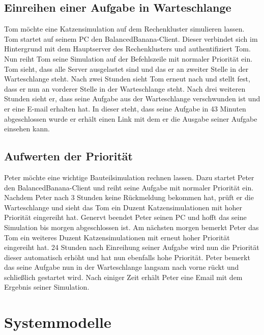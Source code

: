 \documentclass[a4paper,12pt]{article}
\begin{document}
\subsection{\textbf{Einreihen einer Aufgabe in Warteschlange}}
Tom möchte eine Katzensimulation auf dem Rechenkluster simulieren lassen. %
Tom startet auf seinem PC den BalancedBanana-Client. Dieser verbindet sich im Hintergrund mit dem Hauptserver des Rechenklusters und authentifiziert Tom.
Nun reiht Tom seine Simulation auf der Befehlszeile mit normaler Priorität ein.
Tom sieht, dass alle Server ausgelastet sind und das er an zweiter Stelle in der Warteschlange steht.
Nach zwei Stunden sieht Tom erneut nach und stellt fest, dass er nun an vorderer Stelle in der Warteschlange steht.
Nach drei weiteren Stunden sieht er, dass seine Aufgabe aus der Warteschlange verschwunden ist und er eine E-mail erhalten hat.
In dieser steht, dass seine Aufgabe in 43 Minuten abgeschlossen wurde er erhält einen Link mit dem er die Ausgabe seiner Aufgabe einsehen kann.

\subsection{\textbf{Aufwerten der Priorität}}
Peter möchte eine wichtige Bauteilsimulation rechnen lassen.
Dazu startet Peter den BalancedBanana-Client und reiht seine Aufgabe mit normaler Priorität ein.
Nachdem Peter nach 3 Stunden keine Rückmeldung bekommen hat, prüft er die Warteschlange und sieht das Tom ein Duzent Katzensimulationen mit hoher Priorität eingereiht hat.
Genervt beendet Peter seinen PC und hofft das seine Simulation bis morgen abgeschlossen ist.
Am nächsten morgen bemerkt Peter das Tom ein weiteres Duzent Katzensimulationen mit erneut hoher Priorität eingereiht hat.
24 Stunden nach Einreihung seiner Aufgabe wird nun die Priorität dieser automatisch erhöht und hat nun ebenfalls hohe Priorität.
Peter bemerkt das seine Aufgabe nun in der Warteschlange langsam nach vorne rückt und schließlich gestartet wird. 
Nach einiger Zeit erhält Peter eine Email mit dem Ergebnis seiner Simulation.

\section{Systemmodelle}

\end{document}
